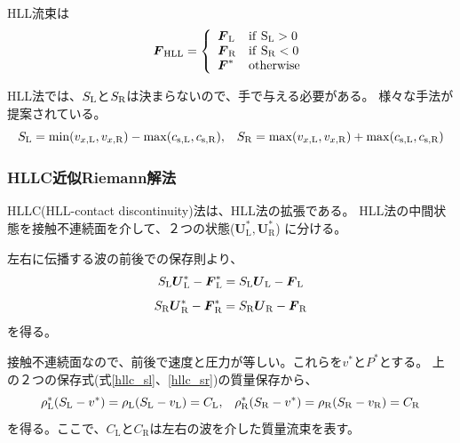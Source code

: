 \begin{screen}
HLL流束は
\begin{equation}
    {\mbox{\boldmath $ F$}}_\mathrm{HLL}
    =\left\{
    \begin{array}{ll}
         {\mbox{\boldmath $ F$}}_\mathrm{L} & \mathrm{if~S_\mathrm{L} > 0} \\
         {\mbox{\boldmath $ F$}}_\mathrm{R} & \mathrm{if~S_\mathrm{R} < 0} \\
         {\mbox{\boldmath $ F$}}^* & \mathrm{otherwise} \\
    \end{array}
    \right.
\end{equation}
\end{screen}

\vspace{1cm}

HLL法では、$S_\mathrm{L}$と$S_\mathrm{R}$は決まらないので、手で与える必要がある。
様々な手法が提案されている。
\begin{equation}
   S_\mathrm{L} = \min(v_{x,\mathrm{L}}, v_{x,\mathrm{R}}) -  
    \max(c_\mathrm{s,L}, c_\mathrm{s,R}) ,\;\;\;
   S_\mathrm{R} = \max(v_{x,\mathrm{L}}, v_{x,\mathrm{R}}) +  
    \max(c_\mathrm{s,L}, c_\mathrm{s,R}) 
\end{equation}

\clearpage
\subsubsection{HLLC近似Riemann解法}

HLLC(HLL-contact discontinuity)法は、HLL法の拡張である\citep{Toro1994}。
HLL法の中間状態を接触不連続面を介して、２つの状態($\bm{ U}_\mathrm{L}^*,\bm{ U}_\mathrm{R}^*$)
に分ける。

左右に伝播する波の前後での保存則より、
\begin{equation}
    S_\mathrm{L} {\mbox{\boldmath $U$}}^*_\mathrm{L} - {\mbox{\boldmath $F$}}^*_\mathrm{L}
    = S_\mathrm{L} {\mbox{\boldmath $U$}}_\mathrm{L} - {\mbox{\boldmath $F$}}_\mathrm{L}
    \label{hllc_sl}
\end{equation}
\begin{equation}
    S_\mathrm{R} {\mbox{\boldmath $ U$}}_\mathrm{R}^* - {\mbox{\boldmath $ F$}}_\mathrm{R}^*
    = S_\mathrm{R} {\mbox{\boldmath $ U$}}_\mathrm{R} - {\mbox{\boldmath $ F$}}_\mathrm{R}
    \label{hllc_sr}
\end{equation}
を得る。

接触不連続面なので、前後で速度と圧力が等しい。これらを$v^*$と$P^*$とする。
上の２つの保存式(式\ref{hllc_sl}、\ref{hllc_sr})の質量保存から、
\begin{equation}
 \rho_\mathrm{L}^* (S_\mathrm{L} - v^*) = \rho_\mathrm{L} (S_\mathrm{L} - v_\mathrm{L}) = C_\mathrm{L},\;\;\;
 \rho_\mathrm{R}^* (S_\mathrm{R} - v^*) = \rho_\mathrm{R} (S_\mathrm{R} - v_\mathrm{R}) = C_\mathrm{R}
 \label{hllc_mass}
\end{equation}
を得る。ここで、$C_\mathrm{L}$と$C_\mathrm{R}$は左右の波を介した質量流束を表す。

